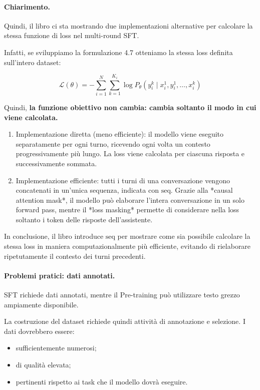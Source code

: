 \paragraph{Chiarimento.}
Quindi, il libro ci sta mostrando due implementazioni alternative per calcolare la stessa funzione di loss nel multi-round SFT.

Infatti, se sviluppiamo la formulazione 4.7 otteniamo la stessa loss definita sull'intero dataset:

$$
\mathcal{L}(\theta)=
-\sum_{i=1}^{N}\sum_{k=1}^{K_i}
\log P_\theta(y_i^k\mid x_i^1,y_i^1,\ldots,x_i^k)
$$

Quindi, \textbf{la funzione obiettivo non cambia: cambia soltanto il modo in cui viene calcolata.}
\begin{enumerate}
    \item Implementazione diretta (meno efficiente): il modello viene eseguito separatamente per ogni turno, ricevendo ogni volta un contesto progressivamente più lungo. La loss viene calcolata per ciascuna risposta e successivamente sommata.
    \item Implementazione efficiente: tutti i turni di una conversazione vengono concatenati in un'unica sequenza, indicata con $\mathrm{seq}$. Grazie alla *causal attention mask*, il modello può elaborare l'intera conversazione in un solo forward pass, mentre il *loss masking* permette di considerare nella loss soltanto i token delle risposte dell'assistente.

\end{enumerate}
In conclusione, il libro introduce $\mathrm{seq}$ per mostrare come sia possibile calcolare la stessa loss in maniera computazionalmente più efficiente, evitando di rielaborare ripetutamente il contesto dei turni precedenti.

\newpage

\paragraph{Problemi pratici: dati annotati.}
SFT richiede dati annotati, mentre il Pre-training
può utilizzare testo grezzo ampiamente disponibile.

La costruzione del dataset richiede quindi attività
di annotazione e selezione. I dati dovrebbero essere:

\begin{itemize}
    \item sufficientemente numerosi;

    \item di qualità elevata;

    \item pertinenti rispetto ai task che il modello
    dovrà eseguire.
\end{itemize}

